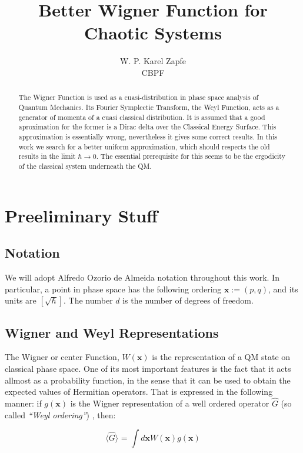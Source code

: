 \documentclass[a4paper,10pt]{article}
\title{Better Wigner Function for Chaotic Systems}
\author{ W. P. Karel Zapfe\\CBPF}
\newcommand{\xfase}{\mathbf{x}}
\newcommand{\Prom}[2]{\langle #1\rangle_{#2}}
\begin{document}
\maketitle

\begin{abstract}

The Wigner Function is used as a cuasi-distribution in phase space analysis
of Quantum Mechanics. Its Fourier Symplectic Transform, the Weyl Function, 
acts as a generator of momenta of a cuasi classical distribution. It is
assumed that a good aproximation for the former is a Dirac delta over
the Classical Energy Surface. This approximation is essentially wrong,
nevertheless it gives some correct results.
In this work we search for a better uniform approximation, which
should respects the old results in the limit $\hbar\rightarrow 0$.
The essential prerequisite for this seems to be the ergodicity of
the classical system underneath the QM.

\end{abstract}

\section{Preeliminary Stuff}

\subsection{Notation}

We will adopt Alfredo Ozorio de Almeida notation throughout this work. 
In particular, a point in phase space has the 
following ordering  $\xfase:=(p,q)$, and its units are $[\sqrt{\hbar}]$.
The number $d$ is the number of degrees of freedom.

\subsection{Wigner and Weyl Representations}

The Wigner or center Function, $W(\xfase)$ is the representation
of a QM  state on classical phase space. One of its
most important features is the fact that it acts allmost as a 
probability function, in the sense that it  can be used to 
obtain the expected values of Hermitian operators. That is expressed
in the following manner: if $g(\xfase)$ is the Wigner representation
of a well ordered operator $\hat{G}$ 
(so called \emph{``Weyl ordering''}) , 
then:


\begin{equation}
\Prom{\hat{G}}{}=\int d\xfase W(\xfase) g(\xfase)
\end{equation}
\end{document}
